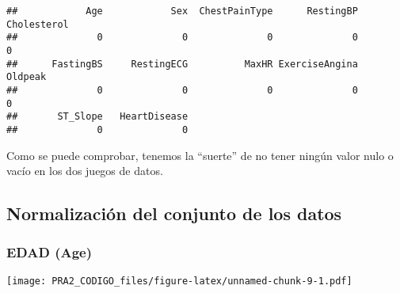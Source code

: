 \documentclass[
]{article}
\newenvironment{Shaded}{\begin{snugshade}}{\end{snugshade}}
\newcommand{\AttributeTok}[1]{\textcolor[rgb]{0.80,0.80,0.80}{#1}}
\newcommand{\CommentTok}[1]{\textcolor[rgb]{0.50,0.62,0.50}{#1}}
\newcommand{\DecValTok}[1]{\textcolor[rgb]{0.86,0.86,0.80}{#1}}
\newcommand{\FloatTok}[1]{\textcolor[rgb]{0.75,0.75,0.82}{#1}}
\newcommand{\FunctionTok}[1]{\textcolor[rgb]{0.94,0.94,0.56}{#1}}
\newcommand{\NormalTok}[1]{\textcolor[rgb]{0.80,0.80,0.80}{#1}}
\newcommand{\OtherTok}[1]{\textcolor[rgb]{0.94,0.94,0.56}{#1}}
\newcommand{\SpecialCharTok}[1]{\textcolor[rgb]{0.86,0.64,0.64}{#1}}
\newcommand{\StringTok}[1]{\textcolor[rgb]{0.80,0.58,0.58}{#1}}
\begin{document}
\begin{verbatim}
##            Age            Sex  ChestPainType      RestingBP    Cholesterol 
##              0              0              0              0              0 
##      FastingBS     RestingECG          MaxHR ExerciseAngina        Oldpeak 
##              0              0              0              0              0 
##       ST_Slope   HeartDisease 
##              0              0
\end{verbatim}

Como se puede comprobar, tenemos la ``suerte'' de no tener ningún valor
nulo o vacío en los dos juegos de datos.

\hypertarget{normalizaciuxf3n-del-conjunto-de-los-datos}{%
\subsection{Normalización del conjunto de los
datos}\label{normalizaciuxf3n-del-conjunto-de-los-datos}}

\hypertarget{edad-age}{%
\subsubsection{EDAD (Age)}\label{edad-age}}

\begin{Shaded}
\end{Shaded}

\texttt{[image: PRA2\_CODIGO\_files/figure-latex/unnamed-chunk-9-1.pdf]}
\end{document}
